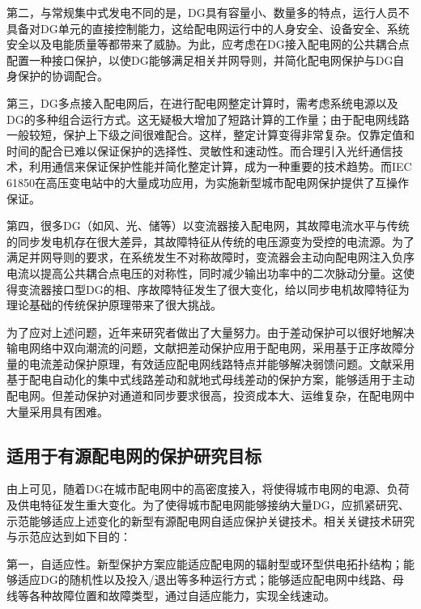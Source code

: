 第二，与常规集中式发电不同的是，DG具有容量小、数量多的特点，运行人员不具备对DG单元的直接控制能力，这给配电网运行中的人身安全、设备安全、系统安全以及电能质量等都带来了威胁。为此，应考虑在DG接入配电网的公共耦合点配置一种接口保护，以使DG能够满足相关并网导则，并简化配电网保护与DG自身保护的协调配合。

第三，DG多点接入配电网后，在进行配电网整定计算时，需考虑系统电源以及DG的多种组合运行方式。这无疑极大增加了短路计算的工作量；由于配电网线路一般较短，保护上下级之间很难配合。这样，整定计算变得非常复杂。仅靠定值和时间的配合已难以保证保护的选择性、灵敏性和速动性。而合理引入光纤通信技术，利用通信来保证保护性能并简化整定计算，成为一种重要的技术趋势。而IEC 61850在高压变电站中的大量成功应用，为实施新型城市配电网保护提供了互操作保证。

第四，很多DG（如风、光、储等）以变流器接入配电网，其故障电流水平与传统的同步发电机存在很大差异，其故障特征从传统的电压源变为受控的电流源。为了满足并网导则的要求，在系统发生不对称故障时，变流器会主动向配电网注入负序电流以提高公共耦合点电压的对称性，同时减少输出功率中的二次脉动分量。这使得变流器接口型DG的相、序故障特征发生了很大变化，给以同步电机故障特征为理论基础的传统保护原理带来了很大挑战。

为了应对上述问题，近年来研究者做出了大量努力\cite{ruisheng2015yi,houlei2014,ruisheng2015shi,liukai2014zhu,nikolaidis2016communication,libin2010han,peichao2016zhi}。由于差动保护可以很好地解决输电网络中双向潮流的问题\cite{ruisheng2015yi}，文献\cite{houlei2014}把差动保护应用于配电网，采用基于正序故障分量的电流差动保护原理，有效适应配电网线路特点并能够解决弱馈问题。文献\cite{ruisheng2015shi}采用基于配电自动化的集中式线路差动和就地式母线差动的保护方案，能够适用于主动配电网。但差动保护对通道和同步要求很高\cite{liukai2014zhu}，投资成本大、运维复杂，在配电网中大量采用具有困难。

\subsection{适用于有源配电网的保护研究目标}

由上可见，随着DG在城市配电网中的高密度接入，将使得城市电网的电源、负荷及供电特征发生重大变化。为了使得城市配电网能够接纳大量DG，应抓紧研究、示范能够适应上述变化的新型有源配电网自适应保护关键技术。相关关键技术研究与示范应达到如下目的：

第一，自适应性。新型保护方案应能适应配电网的辐射型或环型供电拓扑结构；能够适应DG的随机性以及投入/退出等多种运行方式；能够适应配电网中线路、母线等各种故障位置和故障类型，通过自适应能力，实现全线速动。

